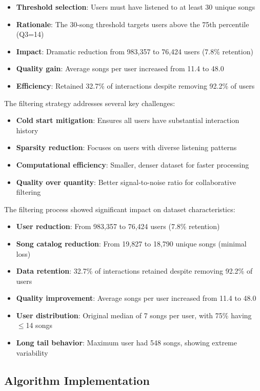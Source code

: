 \documentclass[12pt,a4paper]{article}
\begin{document}
\begin{itemize}
    \item \textbf{Threshold selection}: Users must have listened to at least 30 unique songs
    \item \textbf{Rationale}: The 30-song threshold targets users above the 75th percentile (Q3=14)
    \item \textbf{Impact}: Dramatic reduction from 983,357 to 76,424 users (7.8\% retention)
    \item \textbf{Quality gain}: Average songs per user increased from 11.4 to 48.0
    \item \textbf{Efficiency}: Retained 32.7\% of interactions despite removing 92.2\% of users
\end{itemize}

The filtering strategy addresses several key challenges:
\begin{itemize}
    \item \textbf{Cold start mitigation}: Ensures all users have substantial interaction history
    \item \textbf{Sparsity reduction}: Focuses on users with diverse listening patterns
    \item \textbf{Computational efficiency}: Smaller, denser dataset for faster processing
    \item \textbf{Quality over quantity}: Better signal-to-noise ratio for collaborative filtering
\end{itemize}

The filtering process showed significant impact on dataset characteristics:
\begin{itemize}
    \item \textbf{User reduction}: From 983,357 to 76,424 users (7.8\% retention)
    \item \textbf{Song catalog reduction}: From 19,827 to 18,790 unique songs (minimal loss)
    \item \textbf{Data retention}: 32.7\% of interactions retained despite removing 92.2\% of users
    \item \textbf{Quality improvement}: Average songs per user increased from 11.4 to 48.0
    \item \textbf{User distribution}: Original median of 7 songs per user, with 75\% having $\leq$14 songs
    \item \textbf{Long tail behavior}: Maximum user had 548 songs, showing extreme variability
\end{itemize}

\subsection{Algorithm Implementation}
\end{document}
